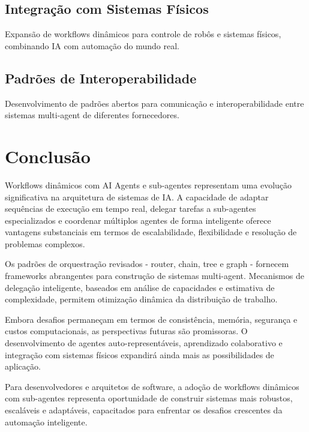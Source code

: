 \documentclass[OA,linenum]{InterPore}
\begin{document}
\subsection{Integração com Sistemas Físicos}

Expansão de workflows dinâmicos para controle de robôs e sistemas físicos, combinando IA com automação do mundo real.

\subsection{Padrões de Interoperabilidade}

Desenvolvimento de padrões abertos para comunicação e interoperabilidade entre sistemas multi-agent de diferentes fornecedores.

\section{Conclusão}

Workflows dinâmicos com AI Agents e sub-agentes representam uma evolução significativa na arquitetura de sistemas de IA. A capacidade de adaptar sequências de execução em tempo real, delegar tarefas a sub-agentes especializados e coordenar múltiplos agentes de forma inteligente oferece vantagens substanciais em termos de escalabilidade, flexibilidade e resolução de problemas complexos.

Os padrões de orquestração revisados - router, chain, tree e graph - fornecem frameworks abrangentes para construção de sistemas multi-agent. Mecanismos de delegação inteligente, baseados em análise de capacidades e estimativa de complexidade, permitem otimização dinâmica da distribuição de trabalho.

Embora desafios permaneçam em termos de consistência, memória, segurança e custos computacionais, as perspectivas futuras são promissoras. O desenvolvimento de agentes auto-representáveis, aprendizado colaborativo e integração com sistemas físicos expandirá ainda mais as possibilidades de aplicação.

Para desenvolvedores e arquitetos de software, a adoção de workflows dinâmicos com sub-agentes representa oportunidade de construir sistemas mais robustos, escaláveis e adaptáveis, capacitados para enfrentar os desafios crescentes da automação inteligente.



\end{document}
